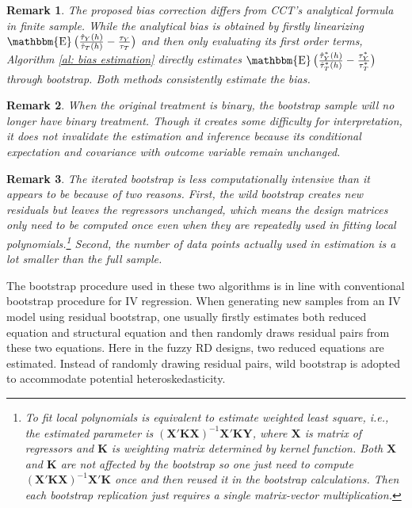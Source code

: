 \documentclass[12pt,]{article}
\newtheorem{remark}{Remark}
\DeclareMathOperator{\1}{\mathbbm{1}}
\DeclareMathOperator{\E}{\mathbbm{E}}
\begin{document}
\begin{remark}
	The proposed bias correction differs from CCT's analytical formula in finite sample. While the analytical bias is obtained by firstly linearizing $\E \big(\frac{\hat{\tau}_Y (h)}{\hat{\tau}_T (h)} - \frac{\tau_Y}{\tau_T} \big)$ and then only evaluating its first order terms, Algorithm \ref{al: bias estimation} directly estimates $\E \big(\frac{\hat{\tau}_Y^* (h)}{\hat{\tau}_T^* (h)} - \frac{\tau_Y^*}{\tau_T^*}\big) $ through bootstrap. Both methods consistently estimate the bias.
\end{remark}

\begin{remark}
	When the original treatment is binary, the bootstrap sample will no longer have binary treatment. Though it creates some difficulty for interpretation, it does not invalidate the estimation and inference because its conditional expectation and covariance with outcome variable remain unchanged.
\end{remark}

\begin{remark}
	The iterated bootstrap is less computationally intensive than it appears to be because of two reasons. First, the wild bootstrap creates new residuals but leaves the regressors unchanged, which means the design matrices only need to be computed once even when they are repeatedly used in fitting local polynomials.\footnote{To fit local polynomials is equivalent to estimate weighted least square, i.e., the estimated parameter is $(\mathbf{X}' \mathbf{K} \mathbf{X})^{-1} \mathbf{X}' \mathbf{K} \mathbf{Y}$, where $\mathbf{X}$ is matrix of regressors and $\mathbf{K}$ is weighting matrix determined by kernel function. Both $\mathbf{X}$ and $\mathbf{K}$ are not affected by the bootstrap so one just need to compute $(\mathbf{X}' \mathbf{K} \mathbf{X})^{-1} \mathbf{X}' \mathbf{K}$ once and then reused it in the bootstrap calculations. Then each bootstrap replication just requires a single matrix-vector multiplication.} Second, the number of data points actually used in estimation is a lot smaller than the full sample. 
\end{remark}

The bootstrap procedure used in these two algorithms is in line with conventional bootstrap procedure for IV regression. When generating new samples from an IV model using residual bootstrap, one usually firstly estimates both reduced equation and structural equation and then randomly draws residual pairs from these two equations. Here in the fuzzy RD designs, two reduced equations are estimated. Instead of randomly drawing residual pairs, wild bootstrap is adopted to accommodate potential heteroskedasticity.
\end{document}
